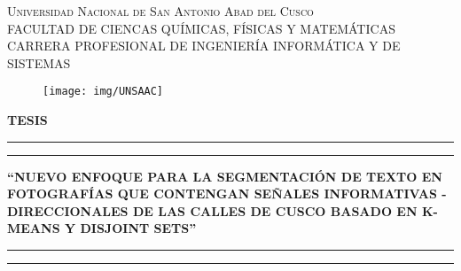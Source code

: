 \documentclass[12pt,oneside,a4paper]{book}
\theoremstyle{definition}
\begin{document}
\frontmatter 
\fancyhead[RO]{{\footnotesize\rightmark}\hspace{2em}\thepage}
\setcounter{tocdepth}{4}
\setcounter{secnumdepth}{4}
\fancyhead[LE]{\thepage\hspace{2em}\footnotesize{\leftmark}}
\fancyhead[RE,LO]{}
\fancyhead[RO]{{\footnotesize\rightmark}\hspace{2em}\thepage}
\onehalfspacing  %

\thispagestyle{empty}

\begin{center}

\textsc{\large Universidad Nacional de San Antonio Abad del Cusco}\\\vspace*{0.04in}
FACULTAD DE CIENCAS QUÍMICAS, FÍSICAS Y MATEMÁTICAS\\
\vspace*{0.04in}
CARRERA PROFESIONAL DE INGENIERÍA INFORMÁTICA Y DE SISTEMAS \\

\captionsetup[figure]{labelformat=empty}
\begin{figure}[htb]
\begin{center}
\texttt{[image: img/UNSAAC]}
\caption[]{}
\end{center}
\end{figure}

\newcommand{\topline}{
  \rule{164mm}{2mm}
  \vspace*{-0.23in}
  \hrule  
}
\newcommand{\downline}{
  \hrule  
  \vspace*{0.02in}
  \rule{164mm}{2mm}
}

\vspace*{-0.6in}
\textbf{TESIS}\\
\topline
\vspace*{0.1in}
\begin{large}
\textbf{``NUEVO ENFOQUE PARA LA SEGMENTACIÓN DE TEXTO EN FOTOGRAFÍAS QUE CONTENGAN SEÑALES INFORMATIVAS - DIRECCIONALES DE LAS CALLES DE CUSCO BASADO EN K-MEANS Y DISJOINT SETS''} \\
\end{large}
\vspace*{0.08in}
\downline
\vspace*{0.25in}


\end{center}
\end{document}

